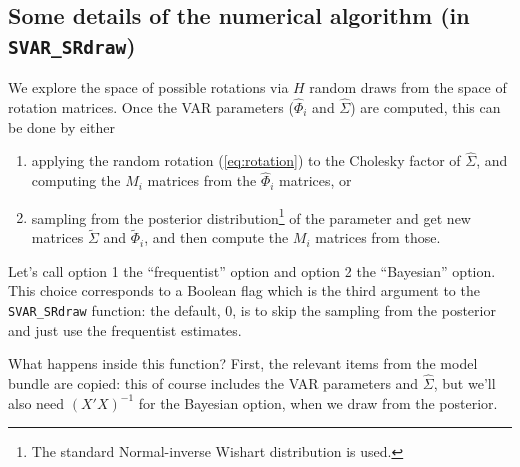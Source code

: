 \documentclass[a4paper,10pt]{article}
\begin{document}
\subsection{Some details of the numerical algorithm (in \texttt{SVAR\_SRdraw})}

We explore the space of possible
rotations via $H$ random draws from the space of rotation matrices.
Once the VAR parameters ($\hat{\Phi}_i$ and $\hat{\Sigma}$)
are computed, this can be done by either
\begin{enumerate}
\item applying the random rotation (\ref{eq:rotation}) to the Cholesky
  factor of $\hat{\Sigma}$, and computing the $M_i$ matrices from the
  $\hat{\Phi}_i$ matrices, or  
\item sampling from the posterior distribution\footnote{The standard
    Normal-inverse Wishart distribution is used.} of the parameter and
  get new matrices $\tilde{\Sigma}$ and $\tilde{\Phi}_i$, and then
  compute the $M_i$ matrices from those.
\end{enumerate}
Let's call option 1 the ``frequentist'' option and option 2 the
``Bayesian'' option.  This choice corresponds to a Boolean flag which
is the third argument to the \texttt{SVAR\_SRdraw} function: the
default, 0, is to skip the sampling from the posterior and just use
the frequentist estimates.

What happens inside this function? First, the relevant items from the
model bundle are copied: this of course includes the VAR parameters
and $\hat{\Sigma}$, but we'll also need $(X'X)^{-1}$ for the Bayesian
option, when we draw from the posterior.
\end{document}
